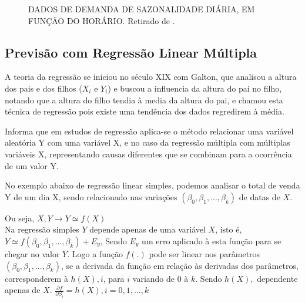 \documentclass[	12pt, Times, openright, twoside, a4paper, english, brazil]{abntex2}
\begin{document}
          \begin{figure}[!ht]
          	\caption{DADOS DE DEMANDA DE SAZONALIDADE DIÁRIA, EM FUNÇÃO DO HORÁRIO. Retirado de \cite{RUAS2012}.\label{fig:seriesTemporais}}
          \end{figure}

        \subsection{Previsão com Regressão Linear Múltipla}
          A teoria da regressão se iniciou no século XIX com Galton, que analisou a altura dos pais e dos filhos ($X_i$ e $Y_i$) e buscou a influencia da altura do pai no filho, notando que a altura do filho tendia à media da altura do pai, e chamou esta técnica de regressão pois existe uma tendência dos dados regredirem à média.

          \cite{Clarice2011} Informa que em estudos de regressão aplica-se o método relacionar uma variável aleatória Y com uma variável X, e no caso da regressão múltipla com múltiplas variáveis X, representando causas diferentes que se combinam para a ocorrência de um valor Y. 

          No exemplo abaixo de regressão linear simples, podemos analisar o total de venda Y de um dia X, sendo relacionado nas variações $(\beta_0, \beta_1, ..., \beta_k)$ de datas de $X$.

          Ou seja, $X,Y \rightarrow Y \simeq f(X) $\\
          Na regressão simples $Y$ depende apenas de uma variável $X$, isto é, $Y \simeq f(\beta_0, \beta_1, ..., \beta_k) + E_y$, Sendo $E_y$ um erro aplicado à esta função para se chegar no valor $Y$. Logo a função $f(.)$ pode ser linear nos parâmetros $(\beta_0, \beta_1, ..., \beta_k)$, se a derivada da função em relação às derivadas dos parâmetros, corresponderem à $h(X),i$, para $i$ variando de $0$ à $k$. Sendo $h(X),$ dependente apenas de $X$.
          $\frac {\partial f}{\partial \beta_i} = h (X),i = 0,1,...,k $
\end{document}
